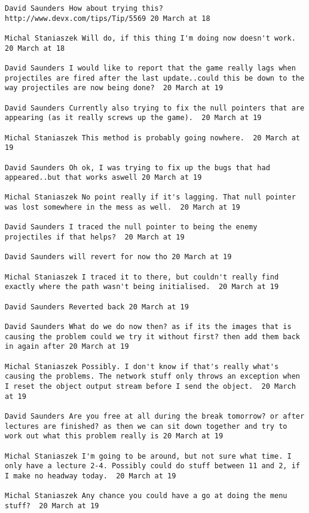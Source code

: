 \begin{verbatim}
David Saunders How about trying this?
http://www.devx.com/tips/Tip/5569 20 March at 18

Michal Staniaszek Will do, if this thing I'm doing now doesn't work.
20 March at 18

David Saunders I would like to report that the game really lags when
projectiles are fired after the last update..could this be down to the
way projectiles are now being done?  20 March at 19

David Saunders Currently also trying to fix the null pointers that are
appearing (as it really screws up the game).  20 March at 19

Michal Staniaszek This method is probably going nowhere.  20 March at
19

David Saunders Oh ok, I was trying to fix up the bugs that had
appeared..but that works aswell 20 March at 19

Michal Staniaszek No point really if it's lagging. That null pointer
was lost somewhere in the mess as well.  20 March at 19

David Saunders I traced the null pointer to being the enemy
projectiles if that helps?  20 March at 19

David Saunders will revert for now tho 20 March at 19

Michal Staniaszek I traced it to there, but couldn't really find
exactly where the path wasn't being initialised.  20 March at 19

David Saunders Reverted back 20 March at 19

David Saunders What do we do now then? as if its the images that is
causing the problem could we try it without first? then add them back
in again after 20 March at 19

Michal Staniaszek Possibly. I don't know if that's really what's
causing the problems. The network stuff only throws an exception when
I reset the object output stream before I send the object.  20 March
at 19

David Saunders Are you free at all during the break tomorrow? or after
lectures are finished? as then we can sit down together and try to
work out what this problem really is 20 March at 19

Michal Staniaszek I'm going to be around, but not sure what time. I
only have a lecture 2-4. Possibly could do stuff between 11 and 2, if
I make no headway today.  20 March at 19

Michal Staniaszek Any chance you could have a go at doing the menu
stuff?  20 March at 19


\end{verbatim}
